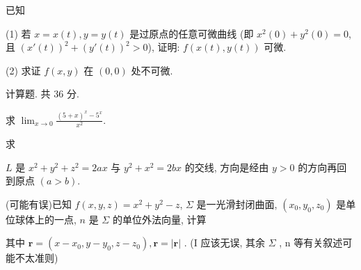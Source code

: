 \par{}
已知\par
\nopagebreak[4]
(1) 若 $x = x(t), y = y(t)$ 是过原点的任意可微曲线 (即 $x^{2}(0) + y^{2}(0) = 0$, 且 $(x'(t))^{2} + (y'(t))^{2} > 0$), 证明: $f(x(t), y(t))$ 可微.\par
(2) 求证 $f(x, y)$ 在 $(0, 0)$ 处不可微.\par
\par{}
计算题. 共 36 分.\par
求 $\lim_{x\to 0}\frac{(5 + x)^x - 5^x}{x^2}.$\par
\par{}
求\par
\nopagebreak[4]
$L$ 是 $x^{2} + y^{2} + z^{2} = 2ax$ 与 $y^{2} + x^{2} = 2bx$ 的交线, 方向是经由 $y > 0$ 的方向再回到原点 $(a > b)$.\par
\par{}
(可能有误)已知 $f(x, y, z) = x^2 + y^2 - z$, $\Sigma$ 是一光滑封闭曲面, $(x_0, y_0, z_0)$ 是单位球体上的一点, $n$ 是 $\Sigma$ 的单位外法向量, 计算\par
\nopagebreak[4]
其中  $\boldsymbol{r}=(x-x_{0},y-y_{0},z-z_{0}),\boldsymbol{r}=|\boldsymbol{r}|$ . (I 应该无误, 其余  $\Sigma$ , n 等有关叙述可能不太准则)\par
